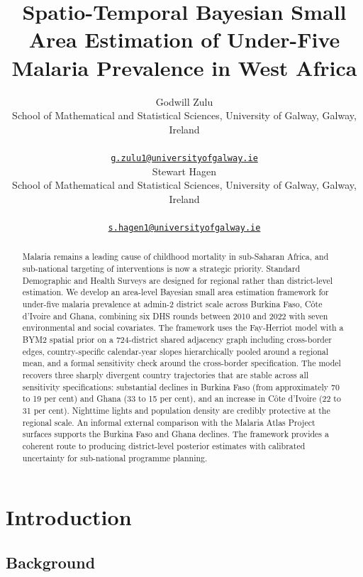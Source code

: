 \documentclass{article}
\title{Spatio-Temporal Bayesian Small Area Estimation of Under-Five
Malaria Prevalence in West Africa}
\author{
    Godwill Zulu
   \\
    School of Mathematical and Statistical Sciences, University of
Galway, Galway, Ireland \\
   \\
  \texttt{\href{mailto:g.zulu1@universityofgalway.ie}{\nolinkurl{g.zulu1@universityofgalway.ie}}} \\
   \And
    Stewart Hagen
   \\
    School of Mathematical and Statistical Sciences, University of
Galway, Galway, Ireland \\
   \\
  \texttt{\href{mailto:s.hagen1@universityofgalway.ie}{\nolinkurl{s.hagen1@universityofgalway.ie}}} \\
  }
\begin{document}
\maketitle


\begin{abstract}
Malaria remains a leading cause of childhood mortality in sub-Saharan
Africa, and sub-national targeting of interventions is now a strategic
priority. Standard Demographic and Health Surveys are designed for
regional rather than district-level estimation. We develop an area-level
Bayesian small area estimation framework for under-five malaria
prevalence at admin-2 district scale across Burkina Faso, Côte d'Ivoire
and Ghana, combining six DHS rounds between 2010 and 2022 with seven
environmental and social covariates. The framework uses the Fay-Herriot
model with a BYM2 spatial prior on a 724-district shared adjacency graph
including cross-border edges, country-specific calendar-year slopes
hierarchically pooled around a regional mean, and a formal sensitivity
check around the cross-border specification. The model recovers three
sharply divergent country trajectories that are stable across all
sensitivity specifications: substantial declines in Burkina Faso (from
approximately 70 to 19 per cent) and Ghana (33 to 15 per cent), and an
increase in Côte d'Ivoire (22 to 31 per cent). Nighttime lights and
population density are credibly protective at the regional scale. An
informal external comparison with the Malaria Atlas Project surfaces
supports the Burkina Faso and Ghana declines. The framework provides a
coherent route to producing district-level posterior estimates with
calibrated uncertainty for sub-national programme planning.
\end{abstract}


\section{Introduction}\label{introduction}

\label{sec:intro}

\subsection{Background}\label{background}
\end{document}
